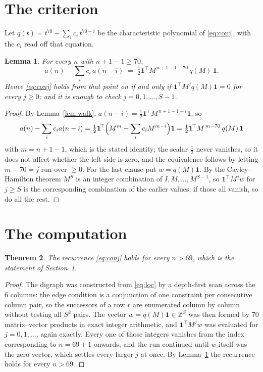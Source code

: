 \documentclass[11pt,a4paper]{article}
\theoremstyle{plain}
\newtheorem{theorem}{Theorem}
\newtheorem{lemma}[theorem]{Lemma}
\theoremstyle{definition}
\begin{document}
\section{The criterion}

Let $q(t)=t^{70}-\sum_i c_i\,t^{70-i}$ be the characteristic polynomial of
\eqref{eq:conj}, with the $c_i$ read off that equation.

\begin{lemma}\label{lem:crit}
For every $n$ with $n+1-1\ge70$,
\[
a(n)-\sum_i c_i\,a(n-i)\;=\;\tfrac1{2}\mathbf{1}^{\!\top}M^{\,n+1-1-70}\,q(M)\,\mathbf{1} .
\]
Hence \eqref{eq:conj} holds from that point on if and only if
$\mathbf{1}^{\!\top}M^{j}q(M)\mathbf{1}=0$ for every $j\ge0$; and it is enough to check
$j=0,1,\dots,S-1$.
\end{lemma}

\begin{proof}
By Lemma~\ref{lem:walk}, $a(n-i)=\tfrac1{2}\mathbf{1}^{\!\top}M^{\,n+1-1-i}\mathbf{1}$, so
\[
a(n)-\sum_i c_i a(n-i)
=\tfrac1{2}\mathbf{1}^{\!\top}\Bigl(M^{m}-\sum_i c_i M^{m-i}\Bigr)\mathbf{1}
=\tfrac1{2}\mathbf{1}^{\!\top}M^{\,m-70}\,q(M)\,\mathbf{1}
\]
with $m=n+1-1$, which is the stated identity; the scalar $\tfrac1{2}$ never vanishes, so it does not affect whether the left side is zero, and the equivalence follows by letting
$m-70=j$ run over $\ge0$. For the last clause put $w=q(M)\mathbf{1}$. By the
Cayley--Hamilton theorem $M^{S}$ is an integer combination of $I,M,\dots,M^{S-1}$, so
$\mathbf{1}^{\!\top}M^{j}w$ for $j\ge S$ is the corresponding combination of the earlier
values; if those all vanish, so do all the rest.
\end{proof}

\section{The computation}

\begin{theorem}
The recurrence \eqref{eq:conj} holds for every $n>69$, which is the statement of
Section~1.
\end{theorem}

\begin{proof}
The digraph was constructed from \eqref{eq:loc} by a depth-first scan across the $6$
columns: the edge condition is a conjunction of one constraint per consecutive column
pair, so the successors of a row $r$ are enumerated column by column without testing all
$S^2$ pairs. The vector $w=q(M)\mathbf{1}\in\mathbb{Z}^{S}$ was then formed by $70$
matrix--vector products in exact integer arithmetic, and $\mathbf{1}^{\!\top}M^{j}w$ was
evaluated for $j=0,1,\dots$, again exactly. Every one of those integers vanishes from the
index corresponding to $n=69+1$ onwards, and the run continued until $w$ itself was the
zero vector, which settles every larger $j$ at once. By Lemma~\ref{lem:crit} the recurrence
holds for every $n>69$.
\end{proof}
\end{document}
